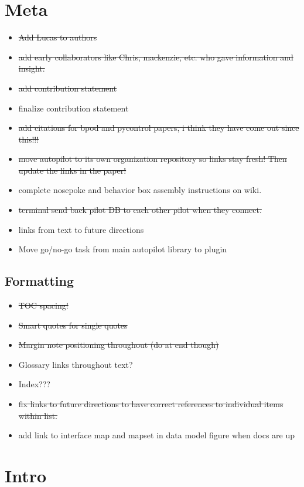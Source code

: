 \section{Meta}

\begin{itemize}
\item \sout{Add Lucas to authors}
\item \sout{add early collaborators like Chris, mackenzie, etc. who gave information and insight.}
\item \sout{add contribution statement}
\item finalize contribution statement
\item \sout{add citations for bpod and pycontrol papers, i think they have come out since this!!!}
\item \sout{move autopilot to its own organization repository so links stay fresh! Then update the links in the paper!}
\item complete nosepoke and behavior box assembly instructions on wiki.
\item \sout{terminal send back pilot DB to each other pilot when they connect.}
\item links from text to future directions
\item Move go/no-go task from main autopilot library to plugin
\end{itemize}

\subsection{Formatting}

\begin{itemize}
\item \sout{TOC spacing!}
\item \sout{Smart quotes for single quotes}
\item \sout{Margin note positioning throughout (do at end though)}
\item Glossary links throughout text?
\item Index???
\item \sout{fix links to future directions to have correct references to individual items within list.}
\item add link to interface map and mapset in data model figure when docs are up
\end{itemize}

\section{Intro}

